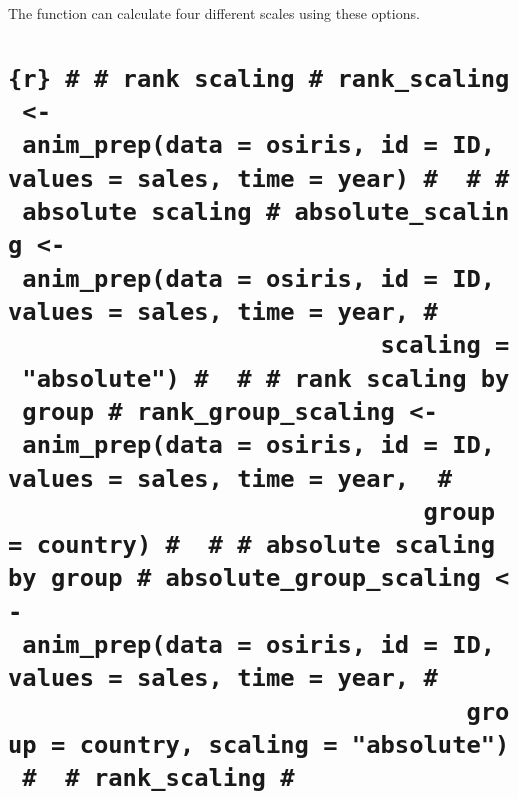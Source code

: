 The function can calculate four different scales using these options.

\hypertarget{r-rank-scaling-rank_scaling---anim_prepdata-osiris-id-id-values-sales-time-year-absolute-scaling-absolute_scaling---anim_prepdata-osiris-id-id-values-sales-time-year-scaling-absolute-rank-scaling-by-group-rank_group_scaling---anim_prepdata-osiris-id-id-values-sales-time-year-group-country-absolute-scaling-by-group-absolute_group_scaling---anim_prepdata-osiris-id-id-values-sales-time-year-group-country-scaling-absolute-rank_scaling}{%
\section{\texorpdfstring{\texttt{\{r\}\ \#\ \#\ rank\ scaling\ \#\ rank\_scaling\ \textless{}-\ anim\_prep(data\ =\ osiris,\ id\ =\ ID,\ values\ =\ sales,\ time\ =\ year)\ \#\ \ \#\ \#\ absolute\ scaling\ \#\ absolute\_scaling\ \textless{}-\ anim\_prep(data\ =\ osiris,\ id\ =\ ID,\ values\ =\ sales,\ time\ =\ year,\ \#\ \ \ \ \ \ \ \ \ \ \ \ \ \ \ \ \ \ \ \ \ \ \ \ \ \ \ \ \ \ \ scaling\ =\ "absolute")\ \#\ \ \#\ \#\ rank\ scaling\ by\ group\ \#\ rank\_group\_scaling\ \textless{}-\ anim\_prep(data\ =\ osiris,\ id\ =\ ID,\ values\ =\ sales,\ time\ =\ year,\ \ \#\ \ \ \ \ \ \ \ \ \ \ \ \ \ \ \ \ \ \ \ \ \ \ \ \ \ \ \ \ \ \ \ \ group\ =\ country)\ \#\ \ \#\ \#\ absolute\ scaling\ by\ group\ \#\ absolute\_group\_scaling\ \textless{}-\ anim\_prep(data\ =\ osiris,\ id\ =\ ID,\ values\ =\ sales,\ time\ =\ year,\ \#\ \ \ \ \ \ \ \ \ \ \ \ \ \ \ \ \ \ \ \ \ \ \ \ \ \ \ \ \ \ \ \ \ \ \ \ \ group\ =\ country,\ scaling\ =\ "absolute")\ \#\ \ \#\ rank\_scaling\ \#}}{\{r\} \# \# rank scaling \# rank\_scaling \textless- anim\_prep(data = osiris, id = ID, values = sales, time = year) \#  \# \# absolute scaling \# absolute\_scaling \textless- anim\_prep(data = osiris, id = ID, values = sales, time = year, \#                               scaling = "absolute") \#  \# \# rank scaling by group \# rank\_group\_scaling \textless- anim\_prep(data = osiris, id = ID, values = sales, time = year,  \#                                 group = country) \#  \# \# absolute scaling by group \# absolute\_group\_scaling \textless- anim\_prep(data = osiris, id = ID, values = sales, time = year, \#                                     group = country, scaling = "absolute") \#  \# rank\_scaling \#}}\label{r-rank-scaling-rank_scaling---anim_prepdata-osiris-id-id-values-sales-time-year-absolute-scaling-absolute_scaling---anim_prepdata-osiris-id-id-values-sales-time-year-scaling-absolute-rank-scaling-by-group-rank_group_scaling---anim_prepdata-osiris-id-id-values-sales-time-year-group-country-absolute-scaling-by-group-absolute_group_scaling---anim_prepdata-osiris-id-id-values-sales-time-year-group-country-scaling-absolute-rank_scaling}}

